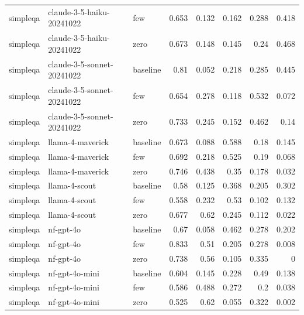 \begin{table}[htbp]
\begin{tabular}{lllrrrrr}
simpleqa & claude-3-5-haiku-20241022 & few & 0.653 & 0.132 & 0.162 & 0.288 & 0.418 \\
simpleqa & claude-3-5-haiku-20241022 & zero & 0.673 & 0.148 & 0.145 & 0.24 & 0.468 \\
simpleqa & claude-3-5-sonnet-20241022 & baseline & 0.81 & 0.052 & 0.218 & 0.285 & 0.445 \\
simpleqa & claude-3-5-sonnet-20241022 & few & 0.654 & 0.278 & 0.118 & 0.532 & 0.072 \\
simpleqa & claude-3-5-sonnet-20241022 & zero & 0.733 & 0.245 & 0.152 & 0.462 & 0.14 \\
simpleqa & llama-4-maverick & baseline & 0.673 & 0.088 & 0.588 & 0.18 & 0.145 \\
simpleqa & llama-4-maverick & few & 0.692 & 0.218 & 0.525 & 0.19 & 0.068 \\
simpleqa & llama-4-maverick & zero & 0.746 & 0.438 & 0.35 & 0.178 & 0.032 \\
simpleqa & llama-4-scout & baseline & 0.58 & 0.125 & 0.368 & 0.205 & 0.302 \\
simpleqa & llama-4-scout & few & 0.558 & 0.232 & 0.53 & 0.102 & 0.132 \\
simpleqa & llama-4-scout & zero & 0.677 & 0.62 & 0.245 & 0.112 & 0.022 \\
simpleqa & nf-gpt-4o & baseline & 0.67 & 0.058 & 0.462 & 0.278 & 0.202 \\
simpleqa & nf-gpt-4o & few & 0.833 & 0.51 & 0.205 & 0.278 & 0.008 \\
simpleqa & nf-gpt-4o & zero & 0.738 & 0.56 & 0.105 & 0.335 & 0 \\
simpleqa & nf-gpt-4o-mini & baseline & 0.604 & 0.145 & 0.228 & 0.49 & 0.138 \\
simpleqa & nf-gpt-4o-mini & few & 0.586 & 0.488 & 0.272 & 0.2 & 0.038 \\
simpleqa & nf-gpt-4o-mini & zero & 0.525 & 0.62 & 0.055 & 0.322 & 0.002 \\
\bottomrule
\end{tabular}
\end{table}

